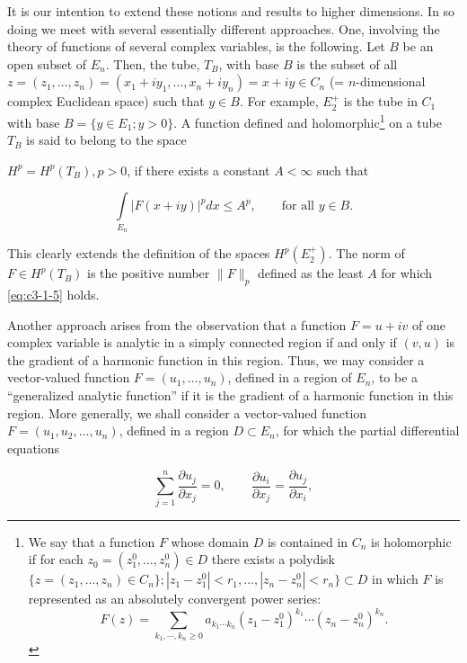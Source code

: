 It is our intention to extend these notions and results to higher dimensions. In so doing we meet with several essentially different approaches. One, involving the theory of functions of several complex variables, is the following. Let $B$ be an open subset of $E_n$. Then, the tube, $T_B$, with base $B$ is the subset of all $z = (z_1, \ldots, z_n) = (x_1 + iy_1, \ldots, x_n + iy_n) = x + iy \in C_n$ (= $n$-dimensional complex Euclidean space) such that $y \in B$. For example, $E_2^+$ is the tube in $C_1$ with base $B = \{y \in E_1; y > 0\}$. A function defined and holomorphic\footnote{We say that a function $F$ whose domain $D$ is contained in $C_n$ is holomorphic if for each $z_0 = (z_1^0, \ldots, z_n^0) \in D$ there exists a polydisk $\{z = (z_1, \ldots, z_n) \in C_n\}; |z_1 - z_1^0| < r_1, \ldots, |z_n - z_n^0| < r_n\} \subset D$ in which $F$ is represented as an absolutely convergent power series: 
\[
F(z)=\sum_{k_{1},\cdots,k_{n}\geq0}a_{k_{1}\cdots k_{n}}(z_{1}-z_{1}^{0})^{k_{1}}\cdots(z_{n}-z_{n}^{0})^{k_{n}}.
\]} on a tube $T_B$ is said to belong to the space

$H^p = H^p(T_B), p > 0$, if there exists a constant $A < \infty$ such that

\begin{equation}\label{eq:c3-1-5}
\int\limits_{E_{n}}|F(x+i y)|^{p}d x\leq A^{p},\qquad\text{for all }y\in B.
\end{equation}

This clearly extends the definition of the spaces $H^p(E_2^+)$. The norm of $F \in H^p(T_B)$ is the positive number $\|F\|_p$ defined as the least $A$ for which \eqref{eq:c3-1-5} holds.

Another approach arises from the observation that a function $F = u + iv$ of one complex variable is analytic in a simply connected region if and only if $(v, u)$ is the gradient of a harmonic function in this region. Thus, we may consider a vector-valued function $F = (u_1, \ldots, u_n)$, defined in a region of $E_n$, to be a ``generalized analytic function'' if it is the gradient of a harmonic function in this region. More generally, we shall consider a vector-valued function $F = (u_1, u_2, \ldots, u_n)$, defined in a region $D \subset E_n$, for which the partial differential equations

\begin{equation}\label{eq:c3-1-6}
\sum_{j=1}^{n}\frac{\partial u_{j}}{\partial x_{j}}=0,\qquad\frac{\partial u_{i}}{\partial x_{j}}=\frac{\partial u_{j}}{\partial x_{i}},
\end{equation}

